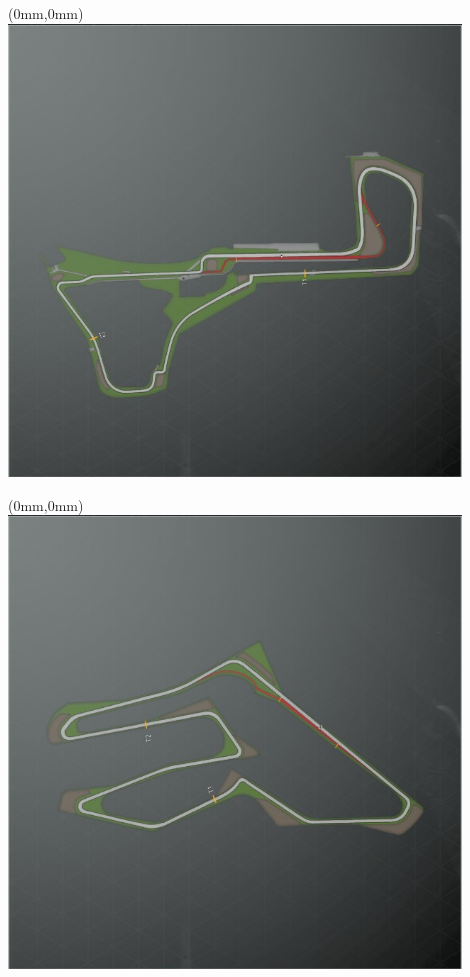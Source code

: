 \null\newpage
\begin{textblock*}{30mm}(0mm,0mm)%
\includegraphics[width=120mm]{TR/2015-05-20_00071.png}
\end{textblock*}
\null\newpage
\begin{textblock*}{30mm}(0mm,0mm)%
\includegraphics[width=120mm]{TR/2015-05-20_00070.png}
\end{textblock*}
